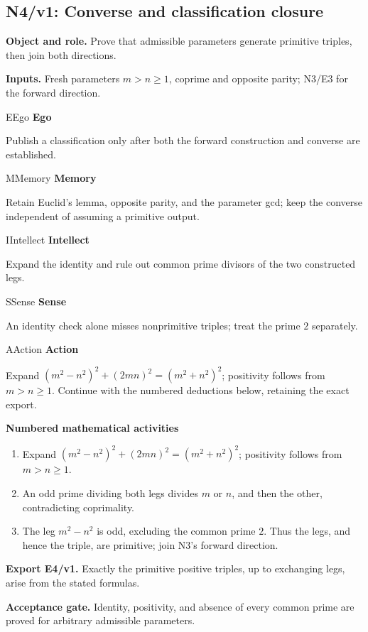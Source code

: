 \documentclass[preprint,12pt,aps,pra,showkeys,amsmath,amssymb,superscriptaddress,floatfix]{revtex4-2}
\theoremstyle{definition}
\theoremstyle{remark}
\newcommand{\mmfaculty}[3]{%
 \begin{mmfacultybox}{#1}{#2}
 {\sffamily\bfseries\color{MMBlue}#2}\par\smallskip #3
 \end{mmfacultybox}}
\newcommand{\field}[2]{\par\smallskip\noindent\textbf{#1.} #2\par}
\begin{document}
\clearpage

\subsection{N4/v1: Converse and classification closure}

\field{Object and role}{Prove that admissible parameters generate primitive triples, then join
both directions.}

\field{Inputs}{Fresh parameters \(m>n\ge1\), coprime and opposite parity; N3/E3 for the
forward direction.}

\mmfaculty{E}{Ego}{Publish a classification only after both the forward construction and
converse are established.}

\mmfaculty{M}{Memory}{Retain Euclid's lemma, opposite parity, and the parameter gcd; keep the
converse independent of assuming a primitive output.}

\mmfaculty{I}{Intellect}{Expand the identity and rule out common prime divisors of the two
constructed legs.}

\mmfaculty{S}{Sense}{An identity check alone misses nonprimitive triples; treat the prime
\(2\) separately.}

\mmfaculty{A}{Action}{Expand \((m^2-n^2)^2+(2mn)^2=(m^2+n^2)^2\); positivity follows from
\(m>n\ge1\). Continue with the numbered deductions below, retaining the
exact export.}

\smallskip\noindent\textbf{Numbered mathematical activities}

\begin{enumerate}[label=N4.\arabic*,leftmargin=3.4em]

\item Expand \((m^2-n^2)^2+(2mn)^2=(m^2+n^2)^2\); positivity follows from
\(m>n\ge1\).

\item An odd prime dividing both legs divides \(m\) or \(n\), and then the
other, contradicting coprimality.

\item The leg \(m^2-n^2\) is odd, excluding the common prime \(2\). Thus the
legs, and hence the triple, are primitive; join N3's forward direction.

\end{enumerate}

\field{Export E4/v1}{Exactly the primitive positive triples, up to exchanging legs, arise
from the stated formulas.}

\field{Acceptance gate}{Identity, positivity, and absence of every common prime are proved for
arbitrary admissible parameters.}
\end{document}
